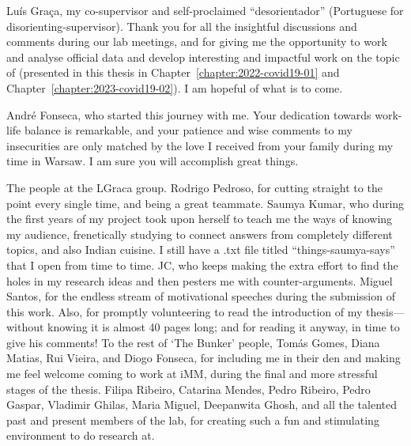 Luís Graça, my co-supervisor and self-proclaimed ``desorientador'' (Portuguese for disorienting-supervisor).
Thank you for all the insightful discussions and comments during our lab meetings, and for giving me the opportunity to work and analyse official data and develop interesting and impactful work on the topic of \sars (presented in this thesis in Chapter~\ref{chapter:2022-covid19-01} and Chapter~\ref{chapter:2023-covid19-02}).
I am hopeful of what is to come.


André Fonseca, who started this journey with me.
Your dedication towards work-life balance is remarkable, and your patience and wise comments to my insecurities are only matched by the love I received from your family during my time in Warsaw.
I am sure you will accomplish great things.

The people at the LGraca group.
Rodrigo Pedroso, for cutting straight to the point every single time, and being a great teammate.
Saumya Kumar, who during the first years of my project took upon herself to teach me the ways of knowing my audience, frenetically studying to connect answers from completely different topics, and also Indian cuisine. I still have a .txt file titled ``things-saumya-says'' that I open from time to time.
JC, who keeps making the extra effort to find the holes in my research ideas and then pesters me with counter-arguments.
Miguel Santos, for the endless stream of motivational speeches during the submission of this work. Also, for promptly volunteering to read the introduction of my thesis---without knowing it is almost 40 pages long; and for reading it anyway, in time to give his comments!
To the rest of `The Bunker' people, Tomás Gomes, Diana Matias, Rui Vieira, and Diogo Fonseca, for including me in their den and making me feel welcome coming to work at iMM, during the final and more stressful stages of the thesis.
Filipa Ribeiro, Catarina Mendes, Pedro Ribeiro, Pedro Gaspar, Vladimir Ghilas, Maria Miguel, Deepanwita Ghosh, and all the talented past and present members of the lab, for creating such a fun and stimulating environment to do research at.

